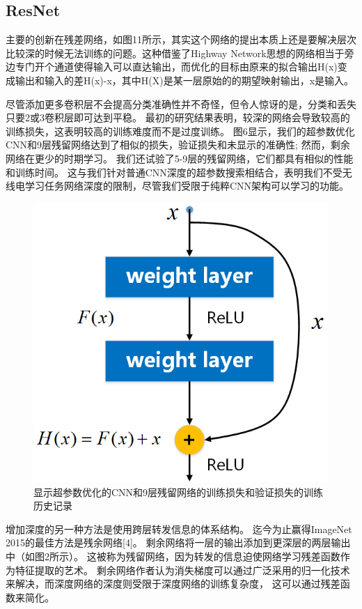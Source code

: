\subsection{ResNet}
主要的创新在残差网络，如图11所示，其实这个网络的提出本质上还是要解决层次比较深的时候无法训练的问题。这种借鉴了Highway Network思想的网络相当于旁边专门开个通道使得输入可以直达输出，而优化的目标由原来的拟合输出H(x)变成输出和输入的差H(x)-x，其中H(X)是某一层原始的的期望映射输出，x是输入。\par
尽管添加更多卷积层不会提高分类准确性并不奇怪，但令人惊讶的是，分类和丢失只要2或3卷积层即可达到平稳。 最初的研究结果表明，较深的网络会导致较高的训练损失，这表明较高的训练难度而不是过度训练。 图6显示，我们的超参数优化CNN和9层残留网络达到了相似的损失，验证损失和未显示的准确性; 然而，剩余网络在更少的时期学习。 我们还试验了5-9层的残留网络，它们都具有相似的性能和训练时间。 这与我们针对普通CNN深度的超参数搜索相结合，表明我们不受无线电学习任务网络深度的限制，尽管我们受限于纯粹CNN架构可以学习的功能。\par

\begin{figure}[!h]
	\centering
	\includegraphics[scale=0.6]{figures/chapter_5/fig_5_6}
	\caption{显示超参数优化的CNN和9层残留网络的训练损失和验证损失的训练历史记录}
\end{figure}


增加深度的另一种方法是使用跨层转发信息的体系结构。
迄今为止赢得ImageNet 2015的最佳方法是残余网络[4]。
剩余网络将一层的输出添加到更深层的两层输出中（如图2所示）。
这被称为残留网络，因为转发的信息迫使网络学习残差函数作为特征提取的艺术。 
剩余网络作者认为消失梯度可以通过广泛采用的归一化技术来解决，而深度网络的深度则受限于深度网络的训练复杂度，
这可以通过残差函数来简化。\par


